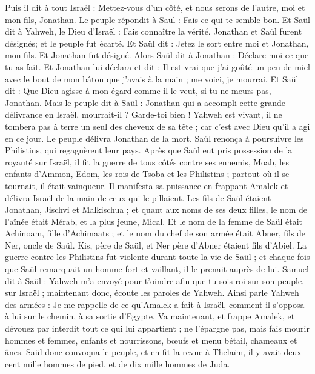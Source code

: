 \begin{multicols}{2}
Puis il dit à tout Israël : Mettez-vous d'un côté, et nous serons de l'autre, moi et mon fils, Jonathan. Le peuple répondit à Saül : Fais ce qui te semble bon.
Et Saül dit à Yahweh, le Dieu d'Israël : Fais connaître la vérité. Jonathan et Saül furent désignés; et le peuple fut écarté.
Et Saül dit : Jetez le sort entre moi et Jonathan, mon fils. Et Jonathan fut désigné.
Alors Saül dit à Jonathan : Déclare-moi ce que tu as fait. Et Jonathan lui déclara et dit : Il est vrai que j'ai goûté un peu de miel avec le bout de mon bâton que j'avais à la main ; me voici, je mourrai.
Et Saül dit : Que Dieu agisse à mon égard comme il le veut, si tu ne meurs pas, Jonathan.
Mais le peuple dit à Saül : Jonathan qui a accompli cette grande délivrance en Israël, mourrait-il ? Garde-toi bien ! Yahweh est vivant, il ne tombera pas à terre un seul des cheveux de sa tête ; car c’est avec Dieu qu’il a agi en ce jour. Le peuple délivra Jonathan de la mort.
Saül renonça à poursuivre les Philistins, qui regagnèrent leur pays.
Après que Saül eut pris possession de la royauté sur Israël, il fit la guerre de tous côtés contre ses ennemis, Moab, les enfants d’Ammon, Edom, les rois de Tsoba et les Philistins ; partout où il se tournait, il était vainqueur.
Il manifesta sa puissance en frappant Amalek et délivra Israël de la main de ceux qui le pillaient.
Les fils de Saül étaient Jonathan, Jischvi et Malkischua ; et quant aux noms de ses deux filles, le nom de l'aînée était Mérab, et la plus jeune, Mical.
Et le nom de la femme de Saül était Achinoam, fille d'Achimaats ; et le nom du chef de son armée était Abner, fils de Ner, oncle de Saül.
Kis, père de Saül, et Ner père d'Abner étaient fils d'Abiel.
La guerre contre les Philistins fut violente durant toute la vie de Saül ; et chaque fois que Saül remarquait un homme fort et vaillant, il le prenait auprès de lui.
\VerseOne{}Samuel dit à Saül : Yahweh m'a envoyé pour t'oindre afin que tu sois roi sur son peuple, sur Israël ; maintenant donc, écoute les paroles de Yahweh.
Ainsi parle Yahweh des armées : Je me rappelle de ce qu'Amalek a fait à Israël, comment il s'opposa à lui sur le chemin, à sa sortie d'Egypte.
Va maintenant, et frappe Amalek, et dévouez par interdit tout ce qui lui appartient ; ne l’épargne pas, mais fais mourir hommes et femmes, enfants et nourrissons, bœufs et menu bétail, chameaux et ânes.
Saül donc convoqua le peuple, et en fit la revue à Thelaïm, il y avait deux cent mille hommes de pied, et de dix mille hommes de Juda.

\end{multicols}
